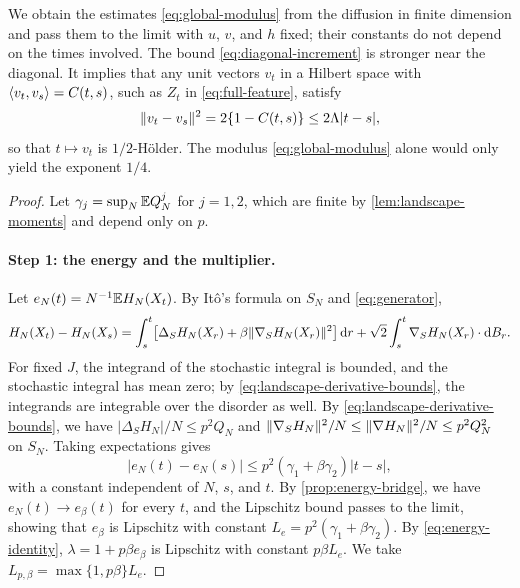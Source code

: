 We obtain the estimates \eqref{eq:global-modulus} from the diffusion in finite dimension and pass them to the limit with $u$, $v$, and $h$ fixed; their constants do not depend on the times involved. The bound \eqref{eq:diagonal-increment} is stronger near the diagonal. It implies that any unit vectors $v_t$ in a Hilbert space with $\left\langle v_t,v_s\right\rangle=C(t,s)$, such as $Z_t$ in \eqref{eq:full-feature}, satisfy
\[
 \lVert v_t-v_s\rVert^2=2\{1-C(t,s)\}\le2\Lambda|t-s|,
\]
so that $t\mapsto v_t$ is $1/2$-H\"older. The modulus \eqref{eq:global-modulus} alone would only yield the exponent $1/4$.

\begin{proof}
Let $\gamma_j=\sup_N\mathbb E Q_N^j$ for $j=1,2$, which are finite by \cref{lem:landscape-moments} and depend only on $p$.

\paragraph{Step 1: the energy and the multiplier.}
Let $e_N(t)=N^{-1}\mathbb E H_N(X_t)$. By It\^o's formula on $S_N$ and \eqref{eq:generator},
\[
 H_N(X_t)-H_N(X_s)=\int_s^t\bigl[\Delta_SH_N(X_r)+\beta\lVert\nabla_SH_N(X_r)\rVert^2\bigr]\mathop{}\!\mathrm d r+\sqrt2\int_s^t\nabla_SH_N(X_r)\cdot\mathop{}\!\mathrm d B_r.
\]
For fixed $J$, the integrand of the stochastic integral is bounded, and the stochastic integral has mean zero; by \eqref{eq:landscape-derivative-bounds}, the integrands are integrable over the disorder as well. By \eqref{eq:landscape-derivative-bounds}, we have $|\Delta_SH_N|/N\le p^2Q_N$ and $\lVert\nabla_SH_N\rVert^2/N\le\lVert\nabla H_N\rVert^2/N\le p^2Q_N^2$ on $S_N$. Taking expectations gives
\[
 |e_N(t)-e_N(s)|\le p^2(\gamma_1+\beta\gamma_2)|t-s|,
\]
with a constant independent of $N$, $s$, and $t$. By \cref{prop:energy-bridge}, we have $e_N(t)\to e_\beta(t)$ for every $t$, and the Lipschitz bound passes to the limit, showing that $e_\beta$ is Lipschitz with constant $L_e=p^2(\gamma_1+\beta\gamma_2)$. By \eqref{eq:energy-identity}, $\lambda=1+p\beta e_\beta$ is Lipschitz with constant $p\beta L_e$. We take $L_{p,\beta}=\max\{1,p\beta\}L_e$.


\end{proof}
